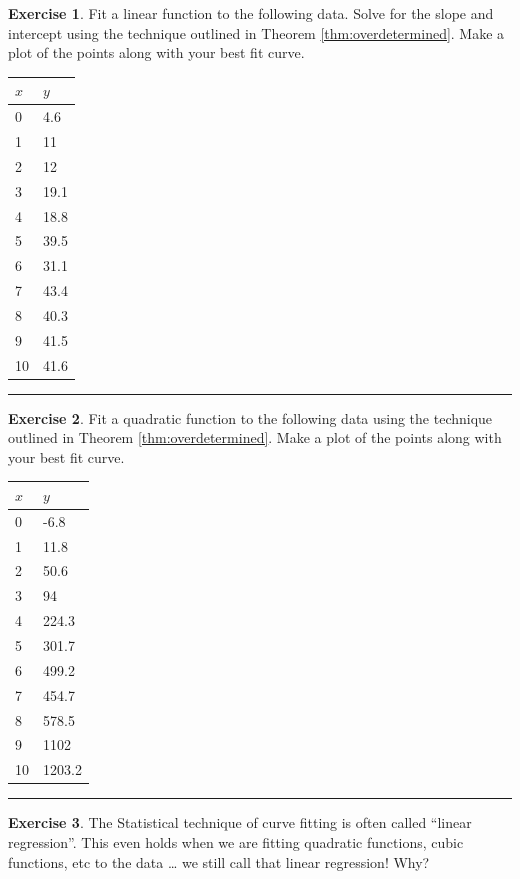 \documentclass[
]{book}
\theoremstyle{definition}
\theoremstyle{definition}
\theoremstyle{definition}
\newtheorem{exercise}{Exercise}[chapter]
\theoremstyle{remark}
\begin{document}
\begin{exercise}
\protect\hypertarget{exr:unnamed-chunk-356}{}{\label{exr:unnamed-chunk-356} }Fit a linear function to the following data. Solve for the slope and intercept using the technique outlined in Theorem \ref{thm:overdetermined}. Make a plot of the points along with your best fit curve.

\begin{longtable}[]{@{}ll@{}}
\toprule
\(x\) & \(y\)\tabularnewline
\midrule
\endhead
0 & 4.6\tabularnewline
1 & 11\tabularnewline
2 & 12\tabularnewline
3 & 19.1\tabularnewline
4 & 18.8\tabularnewline
5 & 39.5\tabularnewline
6 & 31.1\tabularnewline
7 & 43.4\tabularnewline
8 & 40.3\tabularnewline
9 & 41.5\tabularnewline
10 & 41.6\tabularnewline
\bottomrule
\end{longtable}
\end{exercise}

\begin{center}\rule{0.5\linewidth}{0.5pt}\end{center}

\begin{exercise}
\protect\hypertarget{exr:unnamed-chunk-357}{}{\label{exr:unnamed-chunk-357} }Fit a quadratic function to the following data using the technique outlined in Theorem \ref{thm:overdetermined}. Make a plot of the points along with your best fit curve.

\begin{longtable}[]{@{}ll@{}}
\toprule
\(x\) & \(y\)\tabularnewline
\midrule
\endhead
0 & -6.8\tabularnewline
1 & 11.8\tabularnewline
2 & 50.6\tabularnewline
3 & 94\tabularnewline
4 & 224.3\tabularnewline
5 & 301.7\tabularnewline
6 & 499.2\tabularnewline
7 & 454.7\tabularnewline
8 & 578.5\tabularnewline
9 & 1102\tabularnewline
10 & 1203.2\tabularnewline
\bottomrule
\end{longtable}
\end{exercise}

\begin{center}\rule{0.5\linewidth}{0.5pt}\end{center}

\begin{exercise}
\protect\hypertarget{exr:unnamed-chunk-358}{}{\label{exr:unnamed-chunk-358} }The Statistical technique of curve fitting is often called ``linear regression''. This even holds when we are fitting quadratic functions, cubic functions, etc to the data \ldots{} we still call that linear regression! Why?
\end{exercise}
\end{document}
